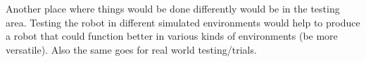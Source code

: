 \documentclass[a4paper,12pt]{article}
\begin{document}
\vspace{5mm}
\noindent Another place where things would be done differently would be in the testing area. Testing the robot in different simulated environments would help to produce a robot that could function better in various kinds of environments (be more versatile). Also the same goes for real world testing/trials.
\end{document}
